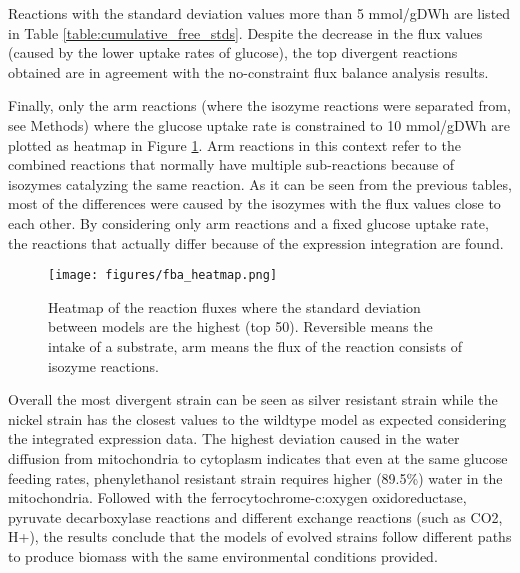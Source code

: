 Reactions with the standard deviation values more than 5 mmol/gDWh are listed in Table \ref{table:cumulative_free_stds}. Despite the decrease in the flux values (caused by the lower uptake rates of glucose), the top divergent reactions obtained are in agreement with the no-constraint flux balance analysis results.



Finally, only the arm reactions (where the isozyme reactions were separated from, see Methods) where the glucose uptake rate is constrained to 10 mmol/gDWh are plotted as heatmap in Figure \ref{fig:fba_heatmap}. Arm reactions in this context refer to the combined reactions that normally have multiple sub-reactions because of isozymes catalyzing the same reaction. As it can be seen from the previous tables, most of the differences were caused by the isozymes with the flux values close to each other. By considering only arm reactions and a fixed glucose uptake rate, the reactions that actually differ because of the expression integration are found.

\begin{figure}[H]
  \begin{center}
  \texttt{[image: figures/fba\_heatmap.png]}
  \caption[Heatmap of the reaction fluxes where the standard deviation between models are the highest (top 50). Reversible means the intake of a substrate, arm means the flux of the reaction consists of isozyme reactions]{Heatmap of the reaction fluxes where the standard deviation between models are the highest (top 50). Reversible means the intake of a substrate, arm means the flux of the reaction consists of isozyme reactions.}
  \label{fig:fba_heatmap}
  \end{center}
\end{figure}

Overall the most divergent strain can be seen as silver resistant strain while the nickel strain has the closest values to the wildtype model as expected considering the integrated expression data. The highest deviation caused in the water diffusion from mitochondria to cytoplasm indicates that even at the same glucose feeding rates, phenylethanol resistant strain requires higher (89.5\%) water in the mitochondria. Followed with the ferrocytochrome-c:oxygen oxidoreductase, pyruvate decarboxylase reactions and different exchange reactions (such as CO2, H+), the results conclude that the models of evolved strains follow different paths to produce biomass with the same environmental conditions provided.


